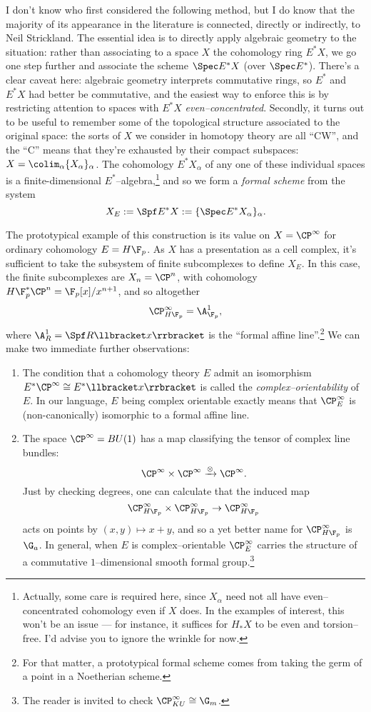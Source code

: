 I don't know who first considered the following method, but I do know that the majority of its appearance in the literature is connected, directly or indirectly, to Neil Strickland.  The essential idea is to directly apply algebraic geometry to the situation: rather than associating to a space $X$ the cohomology ring $E^* X$, we go one step further and associate the scheme $\Spec E^* X$ (over $\Spec E^*$).  There's a clear caveat here: algebraic geometry interprets commutative rings, so $E^*$ and $E^* X$ had better be commutative, and the easiest way to enforce this is by restricting attention to spaces with $E^* X$ \emph{even--concentrated}.  Secondly, it turns out to be useful to remember some of the topological structure associated to the original space: the sorts of $X$ we consider in homotopy theory are all ``CW'', and the ``C'' means that they're exhausted by their compact subspaces: $X = \colim_\alpha \{X_\alpha\}_\alpha$.  The cohomology $E^* X_\alpha$ of any one of these individual spaces is a finite-dimensional $E^*$--algebra,\footnote{Actually, some care is required here, since $X_\alpha$ need not all have even--concentrated cohomology even if $X$ does. In the examples of interest, this won't be an issue --- for instance, it suffices for $H_* X$ to be even and torsion--free. I'd advise you to ignore the wrinkle for now.} and so we form a \emph{formal scheme} from the system \[X_E := \Spf E^* X := \{\Spec E^* X_\alpha\}_{\alpha}.\]

The prototypical example of this construction is its value on $X = \CP^\infty$ for ordinary cohomology $E = H\F_p$.  As $X$ has a presentation as a cell complex, it's sufficient to take the subsystem of finite subcomplexes to define $X_E$.  In this case, the finite subcomplexes are $X_n = \CP^n$, with cohomology $H\F_p^* \CP^n = \F_p[x] / x^{n+1}$, and so altogether \[\CP^\infty_{H\F_p} = \A^1_{\F_p},\] where $\A^1_R = \Spf R\llbracket x \rrbracket$ is the ``formal affine line''.\footnote{For that matter, a prototypical formal scheme comes from taking the germ of a point in a Noetherian scheme.}  We can make two immediate further observations:

\begin{enumerate}
\item The condition that a cohomology theory $E$ admit an isomorphism $E^* \CP^\infty \cong E^*\llbracket x \rrbracket$ is called the \emph{complex--orientability} of $E$.  In our language, $E$ being complex orientable exactly means that $\CP^\infty_E$ is (non-canonically) isomorphic to a formal affine line.
\item The space $\CP^\infty = BU(1)$ has a map classifying the tensor of complex line bundles: \[\CP^\infty \times \CP^\infty \xrightarrow{\otimes} \CP^\infty.\]  Just by checking degrees, one can calculate that the induced map \[\CP^\infty_{H\F_p} \times \CP^\infty_{H\F_p} \to \CP^\infty_{H\F_p}\] acts on points by $(x, y) \mapsto x + y$, and so a yet better name for $\CP^\infty_{H\F_p}$ is $\G_a$.  In general, when $E$ is complex--orientable $\CP^\infty_E$ carries the structure of a commutative $1$--dimensional smooth formal group.\footnote{The reader is invited to check $\CP^\infty_{KU} \cong \G_m$.}
\end{enumerate}



